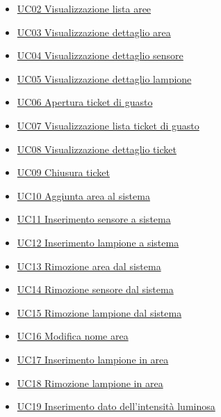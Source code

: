 \begin{itemize}
    \item \hyperref[uc:02]{UC02 Visualizzazione lista aree}
    \item \hyperref[uc:03]{UC03 Visualizzazione dettaglio area}
    \item \hyperref[uc:04]{UC04 Visualizzazione dettaglio sensore}
    \item \hyperref[uc:05]{UC05 Visualizzazione dettaglio lampione}
    \item \hyperref[uc:06]{UC06 Apertura ticket di guasto}
    \item \hyperref[uc:07]{UC07 Visualizzazione lista ticket di guasto}
    \item \hyperref[uc:08]{UC08 Visualizzazione dettaglio ticket}
    \item \hyperref[uc:09]{UC09 Chiusura ticket}
    \item \hyperref[uc:10]{UC10 Aggiunta area al sistema}
    \item \hyperref[uc:11]{UC11 Inserimento sensore a sistema}
    \item \hyperref[uc:12]{UC12 Inserimento lampione a sistema}
    \item \hyperref[uc:13]{UC13 Rimozione area dal sistema}
    \item \hyperref[uc:14]{UC14 Rimozione sensore dal sistema}
    \item \hyperref[uc:15]{UC15 Rimozione lampione dal sistema}
    \item \hyperref[uc:16]{UC16 Modifica nome area}
    \item \hyperref[uc:17]{UC17 Inserimento lampione in area}
    \item \hyperref[uc:18]{UC18 Rimozione lampione in area}
    \item \hyperref[uc:19]{UC19 Inserimento dato dell'intensità luminosa}
\end{itemize}